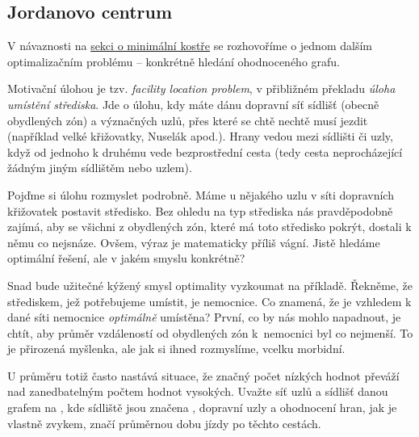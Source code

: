 \subsection{Jordanovo centrum}
\label{ssec:jordanovo-centrum}

V návaznosti na \hyperref[sssec:minimalni-kostra]{sekci o minimální kostře} se
rozhovoříme o jednom dalším optimalizačním problému -- konkrétně hledání
 ohodnoceného grafu.

Motivační úlohou je tzv. \emph{facility location problem}, v přibližném překladu
\emph{úloha umístění střediska}. Jde o úlohu, kdy máte dánu dopravní síť sídlišť
(obecně obydlených zón) a význačných uzlů, přes které se chtě nechtě musí jezdit
(například velké křižovatky, Nuselák apod.). Hrany vedou mezi sídlišti či uzly,
když od jednoho k druhému vede bezprostřední cesta (tedy cesta neprocházející
žádným jiným sídlištěm nebo uzlem).

Pojďme si úlohu rozmyslet podrobně. Máme u nějakého uzlu v síti dopravních
křižovatek postavit středisko. Bez ohledu na typ střediska nás pravděpodobně
zajímá, aby se všichni z obydlených zón, které má toto středisko pokrýt, dostali
k němu co nejsnáze. Ovšem, výraz  je matematicky příliš vágní.
Jistě hledáme optimální řešení, ale v jakém smyslu konkrétně?

Snad bude užitečné kýžený smysl optimality vyzkoumat na příkladě. Řekněme, že
střediskem, jež potřebujeme umístit, je nemocnice. Co znamená, že je vzhledem k
dané síti nemocnice \emph{optimálně} umístěna? První, co by nás mohlo napadnout,
je chtít, aby průměr vzdáleností od obydlených zón k~nemocnici byl co nejmenší.
To je přirozená myšlenka, ale jak si ihned rozmyslíme, vcelku morbidní.

U průměru totiž často nastává situace, že značný počet nízkých hodnot převáží
nad zanedbatelným počtem hodnot vysokých. Uvažte síť uzlů a sídlišť danou grafem
na , kde sídliště jsou značena
, dopravní uzly  a ohodnocení hran, jak je vlastně
zvykem, značí průměrnou dobu jízdy po těchto cestách.

